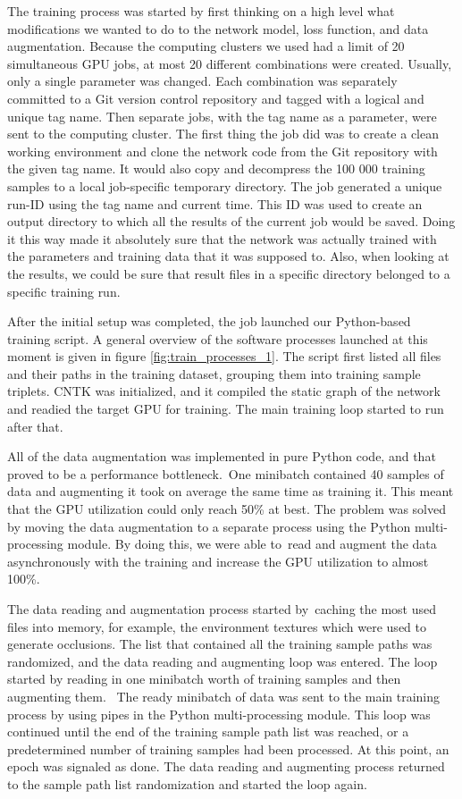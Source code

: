 The training process was started by first thinking on a high level what modifications we wanted to do to the network model, loss function, and data augmentation. Because the computing clusters we used had a limit of 20 simultaneous \ac{GPU} jobs, at most 20 different combinations were created. Usually, only a single parameter was changed. Each combination was separately committed to a Git version control repository and tagged with a logical and unique tag name. Then separate jobs, with the tag name as a parameter, were sent to the computing cluster. The first thing the job did was to create a clean working environment and clone the network code from the Git repository with the given tag name. It would also copy and decompress the 100 000 training samples to a local job-specific temporary directory. The job generated a unique run-ID using the tag name and current time. This ID was used to create an output directory to which all the results of the current job would be saved. Doing it this way made it absolutely sure that the network was actually trained with the parameters and training data that it was supposed to. Also, when looking at the results, we could be sure that result files in a specific directory belonged to a specific training run.

After the initial setup was completed, the job launched our Python-based training script. A general overview of the software processes launched at this moment is given in figure \ref{fig:train_processes_1}. The script first listed all files and their paths in the training dataset, grouping them into training sample triplets. \ac{CNTK} was initialized, and it compiled the static graph of the network and readied the target \ac{GPU} for training. The main training loop started to run after that.

All of the data augmentation was implemented in pure Python code, and that proved to be a performance bottleneck. One minibatch contained 40 samples of data and augmenting it took on average the same time as training it. This meant that the \ac{GPU} utilization could only reach 50\% at best. The problem was solved by moving the data augmentation to a separate process using the Python multi-processing module. By doing this, we were able to read and augment the data asynchronously with the training and increase the \ac{GPU} utilization to almost 100\%.

The data reading and augmentation process started by caching the most used files into memory, for example, the environment textures which were used to generate occlusions. The list that contained all the training sample paths was randomized, and the data reading and augmenting loop was entered. The loop started by reading in one minibatch worth of training samples and then augmenting them.  The ready minibatch of data was sent to the main training process by using pipes in the Python multi-processing module. This loop was continued until the end of the training sample path list was reached, or a predetermined number of training samples had been processed. At this point, an epoch was signaled as done. The data reading and augmenting process returned to the sample path list randomization and started the loop again.

